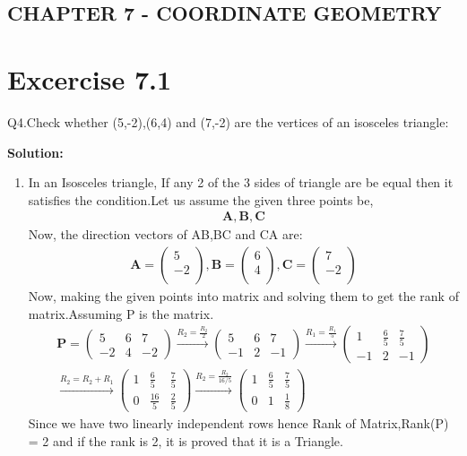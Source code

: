 \documentclass[12pt]{article}
\newcommand{\solution}{\noindent \textbf{Solution: }}
\newcommand{\myvec}[1]{\ensuremath{\begin{pmatrix}#1\end{pmatrix}}}
\let\vec\mathbf
\begin{document}
\begin{center}
\section*{CHAPTER 7 - COORDINATE GEOMETRY}

\end{center}
\section*{Excercise 7.1}

Q4.Check whether (5,-2),(6,4) and (7,-2) are the vertices of an isosceles triangle:

\solution
\begin{enumerate}
\item In an Isosceles triangle, If any 2 of the 3 sides of  triangle are be equal then it satisfies the condition.Let us assume the given three points be,
	\begin{align}
\vec{A} , \vec{B} , \vec{C}
	\end{align}
Now, the direction vectors of AB,BC and CA are:
	\begin{align}
	\vec{A} = \myvec{
	    5\\
	   -2\\
		},
	\vec{B} = \myvec{
	    6\\
		4\\
		},
	\vec{C} = \myvec{
		7\\
	   -2\\
	    }
	\end{align}  
Now, making the given points into matrix and solving them to get the rank of matrix.Assuming P is the matrix.
	\begin{align}
\vec{P} = \myvec{
5&6&7\\
-2&4&-2
}\xrightarrow[]{R_2=\frac{R_2}{2}}
\myvec{
5&6&7\\
-1&2&-1
}\xrightarrow[]{R_1=\frac{R_1}{5}}
\myvec{
1&\frac{6}{5}&\frac{7}{5}\\
-1&2&-1
}\\\xrightarrow[]{R_2=R_2+R_1}
\myvec{
1&\frac{6}{5}&\frac{7}{5}\\
0&\frac{16}{5}&\frac{2}{5}
}\xrightarrow[]{R_2=\frac{R_2}{16/5}}
\myvec{
1&\frac{6}{5}&\frac{7}{5}\\
0&1&\frac{1}{8}
}
	\end{align}
Since we have two linearly independent rows hence Rank of Matrix,Rank(P) = 2 and if the rank is 2, it is proved that it is a Triangle.
	\begin{align}

\end{align}
\end{enumerate}
\end{document}
